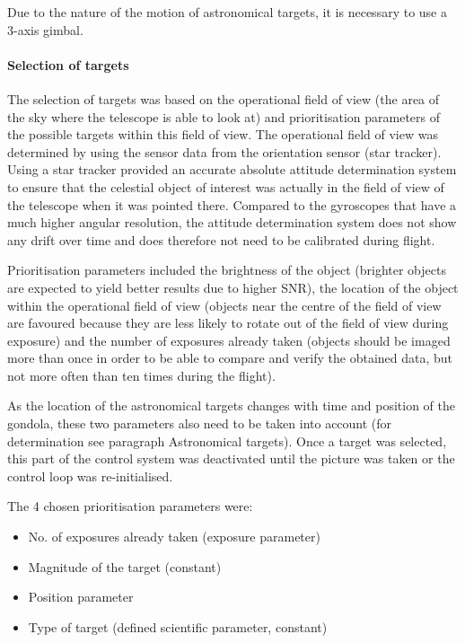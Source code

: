 Due to the nature of the motion of astronomical targets, it is necessary to use a 3-axis gimbal.

\paragraph{Selection of targets}

The selection of targets was based on the operational field of view (the area of the sky where the telescope is able to look at) and prioritisation parameters of the possible targets within this field of view. The operational field of view was determined by using the sensor data from the orientation sensor (star tracker). Using a star tracker provided an accurate absolute attitude determination system to ensure that the celestial object of interest was actually in the field of view of the telescope when it was pointed there. Compared to the gyroscopes that have a much higher angular resolution, the attitude determination system does not show any drift over time and does therefore not need to be calibrated during flight.

Prioritisation parameters included the brightness of the object (brighter objects are expected to yield better results due to higher SNR), the location of the object within the operational field of view (objects near the centre of the field of view are favoured because they are less likely to rotate out of the field of view during exposure) and the number of exposures already taken (objects should be imaged more than once in order to be able to compare and verify the obtained data, but not more often than ten times during the flight). 

As the location of the astronomical targets changes with time and position of the gondola, these two parameters also need to be taken into account (for determination see paragraph Astronomical targets). Once a target was selected, this part of the control system was deactivated until the picture was taken or the control loop was re-initialised.

The 4 chosen prioritisation parameters were:
\begin{itemize}
    \item No. of exposures already taken (exposure parameter)
    \item Magnitude of the target (constant)
    \item Position parameter
    \item Type of target  (defined scientific parameter, constant)
\end{itemize}


